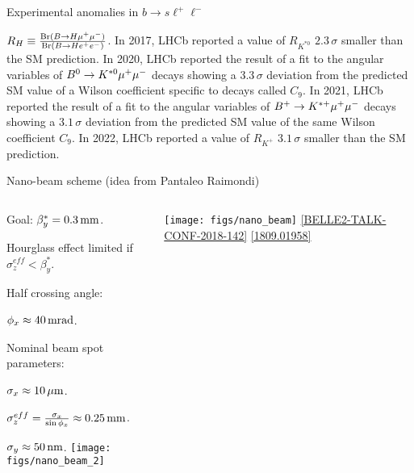 \begin{frame}[noframenumbering]{Experimental anomalies in $b\to s\ell^+\ell^-$}
\bi
\item {$R_{H}\equiv\frac{\mathrm{\mathrm{Br}}(B\rightarrow H\mu^+\mu^-)}{\mathrm{\mathrm{Br}}(B\rightarrow He^+e^-)}$.}
\itemii In 2017, LHCb reported a value of $R_{K^{*0}}$ $2.3\,\sigma$ smaller than the SM prediction.
\itemii In 2020, LHCb reported the result of a fit to the angular variables of $B^0\rightarrow K^{*0}\mu^+\mu^-$ decays showing a $3.3\,\sigma$ deviation from the predicted SM value of a Wilson coefficient specific to \BKll decays called $C_9$.
\itemii In 2021, LHCb reported the result of a fit to the angular variables of $B^+\rightarrow K^{*+}\mu^+\mu^-$ decays showing a $3.1\,\sigma$ deviation from the predicted SM value of the same Wilson coefficient $C_9$.
\itemii In 2022, LHCb reported a value of $R_{K^+}$ $3.1\,\sigma$ smaller than the SM prediction.
\ei
\end{frame}
\begin{frame}[noframenumbering]{Nano-beam scheme (idea from Pantaleo Raimondi)}
\begin{columns}
\begin{column}{0.52\linewidth} 
{\small
\bi
\item Goal: $\beta_y^*=0.3{\rm \,mm}$.
\item Hourglass effect limited if $\sigma^{eff}_z<\beta_y^*$.
\item Half crossing angle:
\bi
\item $\phi_x\approx40\rm \,mrad$.
\ei
\item Nominal beam spot parameters:
\bi
\item $\sigma_x\approx10{\,\mu\rm m}$.
\item $\sigma^{eff}_z=\frac{\sigma_x}{\sin\phi_x}\approx0.25{\rm \,mm}$.
\item $\sigma_y\approx50{\rm \,nm}$.
\ei
\ei
\texttt{[image: figs/nano\_beam\_2]} 
}
\end{column}
\begin{column}{0.48\linewidth}
\texttt{[image: figs/nano\_beam]} 
\small\href{https://docs.belle2.org/record/1212?ln=en}{\color{blue!40!gray} [BELLE2-TALK-CONF-2018-142]}
\href{https://arxiv.org/abs/1809.01958}{\color{blue!40!gray} [1809.01958]}
\end{column}
\end{columns}
\end{frame}
